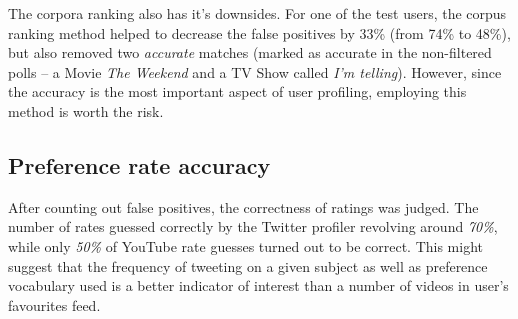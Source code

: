 The corpora ranking also has it's downsides. For one of the test users, the corpus ranking method helped to
decrease the false positives by 33\% (from 74\% to 48\%), but also removed two \textit{accurate} matches (marked as
accurate in the non-filtered polls -- a Movie \textit{The Weekend} and a TV Show called \textit{I'm telling}).
However, since the accuracy is the most important aspect of user profiling, employing this method is worth
the risk.

\subsection{Preference rate accuracy}
After counting out false positives, the correctness of ratings was judged. The
number of rates guessed correctly by the Twitter profiler revolving around \textit{70\%},
while only \textit{50\%} of YouTube rate guesses turned out to be correct. This
might suggest that the frequency of tweeting on a given subject as well as preference vocabulary used
is a better indicator of interest than a number of videos in user's favourites feed.
